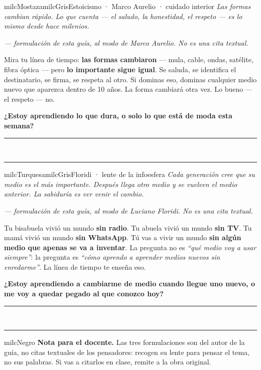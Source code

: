 \documentclass[11pt,letterpaper]{article}
\newcommand{\linead}[1]{\noindent\color{milcLinea}\rule{#1}{0.5pt}\color{milcNegro}}
\begin{document}
\begin{softbox}{milcMostaza}{milcGris}{Estoicismo · Marco Aurelio · cuidado interior}
\textit{Las formas cambian rápido. Lo que cuenta --- el saludo, la honestidad, el respeto --- es lo mismo desde hace milenios.}

{\footnotesize\itshape\color{milcNegro!70}--- formulación de esta guía, al modo de Marco Aurelio. No es una cita textual.}

Mira tu línea de tiempo: \textbf{las formas cambiaron} --- mula, cable, ondas, satélite, fibra óptica --- pero \textbf{lo importante sigue igual}. Se saluda, se identifica el destinatario, se firma, se respeta al otro. Si dominas eso, dominas cualquier medio nuevo que aparezca dentro de 10 años. La forma cambiará otra vez. Lo bueno --- el respeto --- no.

\textbf{¿Estoy aprendiendo lo que dura, o solo lo que está de moda esta semana?}
\end{softbox}
\linead{\linewidth}\\[1mm]
\linead{\linewidth}

\begin{softbox}{milcTurquesa}{milcGris}{Floridi · lente de la infoesfera}
\textit{Cada generación cree que su medio es el más importante. Después llega otro medio y se vuelven el medio anterior. La sabiduría es ver venir el cambio.}

{\footnotesize\itshape\color{milcNegro!70}--- formulación de esta guía, al modo de Luciano Floridi. No es una cita textual.}

Tu bisabuela vivió un mundo \textbf{sin radio}. Tu abuela vivió un mundo \textbf{sin TV}. Tu mamá vivió un mundo \textbf{sin WhatsApp}. Tú vas a vivir un mundo \textbf{sin algún medio que apenas se va a inventar}. La pregunta no es \emph{``qué medio voy a usar siempre''}: la pregunta es \emph{``cómo aprendo a aprender medios nuevos sin enredarme''}. La línea de tiempo te enseña eso.

\textbf{¿Estoy aprendiendo a \textbf{cambiarme} de medio cuando llegue uno nuevo, o me voy a quedar pegado al que conozco hoy?}
\end{softbox}
\linead{\linewidth}\\[1mm]
\linead{\linewidth}

\begin{infoband}{milcNegro}
\textbf{Nota para el docente.} Las tres formulaciones son del autor de la guía, no citas textuales de los pensadores: recogen su lente para pensar el tema, no sus palabras. Si vas a citarlos en clase, remite a la obra original.
\end{infoband}
\end{document}
